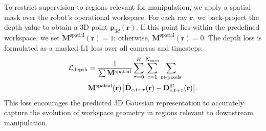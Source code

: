 To restrict supervision to regions relevant for manipulation, we apply a spatial mask over the robot’s operational workspace. For each ray $\mathbf{r}$, we back-project the depth value to obtain a 3D point $\mathbf{p}_{3d}(\mathbf{r})$. If this point lies within the predefined workspace, we set $\mathbf{M}^{\text{spatial}}(\mathbf{r})=1$; otherwise, $\mathbf{M}^{\text{spatial}}(\mathbf{r})=0$. The depth loss is formulated as a masked L1 loss over all cameras and timesteps:
\vspace{-5pt}
\begin{equation}
\vspace{-5pt}
\label{eq:depth_loss}
\begin{split}
\mathcal{L}_{\text{depth}}
&= \frac{1}{\sum \mathbf{M}^{\text{spatial}}}
\sum_{\tau=0}^{H} \sum_{c=1}^{N_{cam}} \sum_{\mathbf{r} \in \text{pixels}}\\
&\mathbf{M}^{\text{spatial}}(\mathbf{r})\,
\big| \hat{\mathbf{D}}_{c,t+\tau}(\mathbf{r})
- \mathbf{D}^{\text{gt}}_{c,t+\tau}(\mathbf{r}) \big|.
\end{split}
\end{equation}
This loss encourages the predicted 3D Gaussian representation to accurately capture the evolution of workspace geometry in regions relevant to downstream manipulation.



